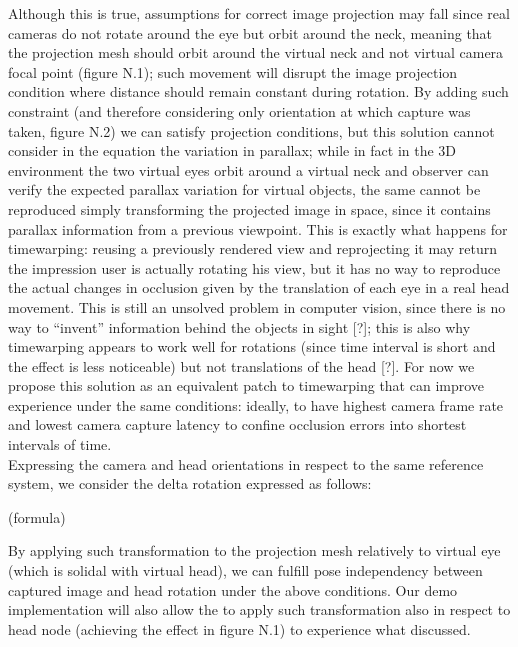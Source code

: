 Although this is true, assumptions for correct image projection may fall since real cameras do not rotate around the eye but orbit around the neck, meaning that the projection mesh should orbit around the virtual neck and not virtual camera focal point (figure N.1); such movement will disrupt the image projection condition where distance should remain constant during rotation. By adding such constraint (and therefore considering only orientation at which capture was taken, figure N.2) we can satisfy projection conditions, but this solution cannot consider in the equation the variation in parallax; while in fact in the 3D environment the two virtual eyes orbit around a virtual neck and observer can verify the expected parallax variation for virtual objects, the same cannot be reproduced simply transforming the projected image in space, since it contains parallax information from a previous viewpoint. This is exactly what happens for timewarping: reusing a previously rendered view and reprojecting it may return the impression user is actually rotating his view, but it has no way to reproduce the actual changes in occlusion given by the translation of each eye in a real head movement. This is still an unsolved problem in computer vision, since there is no way to “invent” information behind the objects in sight [?]; this is also why timewarping appears to work well for rotations (since time interval is short and the effect is less noticeable) but not translations of the head [?]. For now we propose this solution as an equivalent patch to timewarping that can improve experience under the same conditions: ideally, to have highest camera frame rate and lowest camera capture latency to confine occlusion errors into shortest intervals of time.\\
Expressing the camera and head orientations in respect to the same reference system, we consider the delta rotation expressed as follows:

(formula)

By applying such transformation to the projection mesh relatively to virtual eye (which is solidal with virtual head), we can fulfill pose independency between captured image and head rotation under the above conditions. Our demo implementation will also allow the to apply such transformation also in respect to head node (achieving the effect in figure N.1) to experience what discussed.

